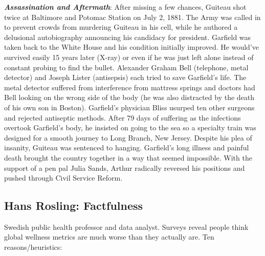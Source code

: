 \documentclass[
]{article}
\begin{document}
\textbf{\emph{Assassination and Aftermath}}: After missing a few
chances, Guiteau shot twice at Baltimore and Potomac Station on July 2,
1881. The Army was called in to prevent crowds from murdering Guiteau in
his cell, while he authored a delusional autobiography announcing his
candidacy for president. Garfield was taken back to the White House and
his condition initially improved. He would've survived easily 15 years
later (X-ray) or even if he was just left alone instead of constant
probing to find the bullet. Alexander Graham Bell (telephone, metal
detector) and Joseph Lister (antisepsis) each tried to save Garfield's
life. The metal detector suffered from interference from mattress
springs and doctors had Bell looking on the wrong side of the body (he
was also distracted by the death of his own son in Boston). Garfield's
physician Bliss usurped ten other surgeons and rejected antiseptic
methods. After 79 days of suffering as the infections overtook
Garfield's body, he insisted on going to the sea so a specialty train
was designed for a smooth journey to Long Branch, New Jersey. Despite
his plea of insanity, Guiteau was sentenced to hanging. Garfield's long
illness and painful death brought the country together in a way that
seemed impossible. With the support of a pen pal Julia Sands, Arthur
radically reversed his positions and pushed through Civil Service
Reform.

\hypertarget{hans-rosling-factfulness}{%
\subsection{Hans Rosling: Factfulness}\label{hans-rosling-factfulness}}

Swedish public health professor and data analyst. Surveys reveal people
think global wellness metrics are much worse than they actually are. Ten
reasons/heuristics:
\end{document}
